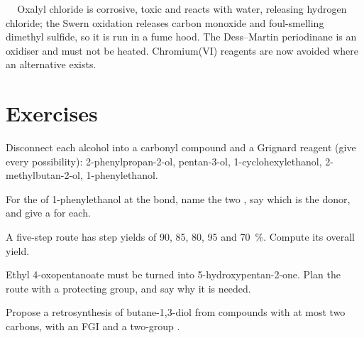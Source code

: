 \begin{safety}{\,\,\,\,\,}
Oxalyl chloride is corrosive, toxic and reacts with water, releasing hydrogen chloride; the Swern
oxidation releases carbon monoxide and foul-smelling dimethyl sulfide, so it is run in a fume hood.
The Dess--Martin periodinane is an oxidiser and must not be heated. Chromium(VI) reagents are now
avoided where an alternative exists.
\end{safety}

\section{Exercises}

\begin{exercise}[$\star$]\label{exo:b2:retrosynthesis:1}
Disconnect each alcohol into a carbonyl compound and a Grignard reagent (give every possibility):
2-phenylpropan-2-ol, pentan-3-ol, 1-cyclohexylethanol, 2-methylbutan-2-ol, 1-phenylethanol.
\end{exercise}

\begin{exercise}[$\star$]\label{exo:b2:retrosynthesis:2}
For the  of 1-phenylethanol at the  bond, name the two , say which is the
donor, and give a  for each.
\end{exercise}

\begin{exercise}[$\star$]\label{exo:b2:retrosynthesis:3}
A five-step route has step yields of 90, 85, 80, 95 and 70~\%. Compute its overall yield.
\end{exercise}

\begin{exercise}[$\star$]\label{exo:b2:retrosynthesis:4}
Ethyl 4-oxopentanoate must be turned into 5-hydroxypentan-2-one. Plan the route with a protecting
group, and say why it is needed.
\end{exercise}

\begin{exercise}[$\star\star$]\label{exo:b2:retrosynthesis:5}
Propose a retrosynthesis of butane-1,3-diol from compounds with at most two carbons, with an FGI and a
two-group .
\end{exercise}

